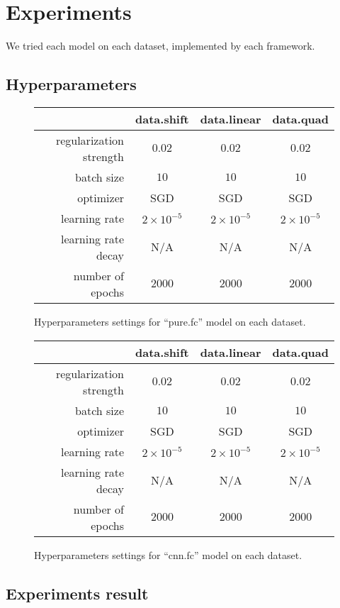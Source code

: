 \documentclass[a4paper]{article}
\begin{document}
\section{Experiments}

We tried each model on each dataset, implemented by each framework.

\subsection{Hyperparameters}

\begin{figure}[H]
\centering
\begin{tabular}{|r|c|c|c|}
\hline
 & data.shift & data.linear & data.quad \\
\hline
regularization strength & $0.02$ & $0.02$ & $0.02$ \\
\hline
batch size & $10$ & $10$ & $10$ \\
\hline
optimizer & SGD & SGD & SGD \\
\hline
learning rate & $2\times10^{-5}$ & $2\times10^{-5}$ & $2\times10^{-5}$\\
\hline
learning rate decay & N/A & N/A & N/A \\
\hline
number of epochs & $2000$ & $2000$ & $2000$ \\
\hline
\end{tabular}
\caption{Hyperparameters settings for ``pure.fc'' model on each dataset.}
\end{figure}

\begin{figure}[H]
\centering
\begin{tabular}{|r|c|c|c|}
\hline
 & data.shift & data.linear & data.quad \\
\hline
regularization strength & $0.02$ & $0.02$ & $0.02$ \\
\hline
batch size & $10$ & $10$ & $10$ \\
\hline
optimizer & SGD & SGD & SGD \\
\hline
learning rate & $2\times10^{-5}$ & $2\times10^{-5}$ & $2\times10^{-5}$\\
\hline
learning rate decay & N/A & N/A & N/A \\
\hline
number of epochs & $2000$ & $2000$ & $2000$ \\
\hline
\end{tabular}
\caption{Hyperparameters settings for ``cnn.fc'' model on each dataset.}
\end{figure}

\subsection{Experiments result}
\end{document}
